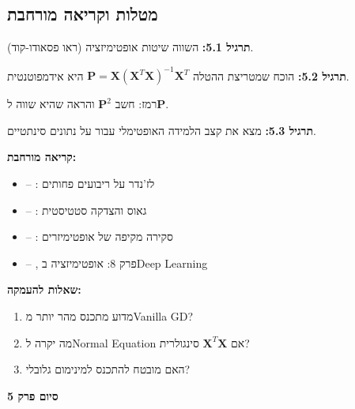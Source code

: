 \subsection*{מטלות וקריאה מורחבת}

\textbf{תרגיל \num{5.1}:} השווה שיטות אופטימיזציה (ראו פסאודו-קוד).

\textbf{תרגיל \num{5.2}:} הוכח שמטריצת ההטלה $\mathbf{P} = \mathbf{X}(\mathbf{X}^T\mathbf{X})^{-1}\mathbf{X}^T$ היא אידמפוטנטית.

רמז: חשב $\mathbf{P}^2$ והראה שהיא שווה ל\en{-}$\mathbf{P}$.

\textbf{תרגיל \num{5.3}:} מצא את קצב הלמידה האופטימלי עבור  על נתונים סינתטיים.

\textbf{קריאה מורחבת:}

\begin{itemize}
\item \cite{legendre1805} – : לז'נדר על ריבועים פחותים
\item \cite{gauss1809} – : גאוס והצדקה סטטיסטית
\item \cite{ruder2016} – : סקירה מקיפה של אופטימיזרים
\item \cite{goodfellow2016} – , פרק \num{8}: אופטימיזציה ב\en{-}Deep Learning
\end{itemize}

\textbf{שאלות להעמקה:}

\begin{enumerate}
\item מדוע  מתכנס מהר יותר מ\en{-}Vanilla GD?
\item מה יקרה ל\en{-}Normal Equation אם $\mathbf{X}^T\mathbf{X}$ סינגולרית?
\item האם  מובטח להתכנס למינימום גלובלי?
\end{enumerate}

\textbf{סיום פרק \num{5}}